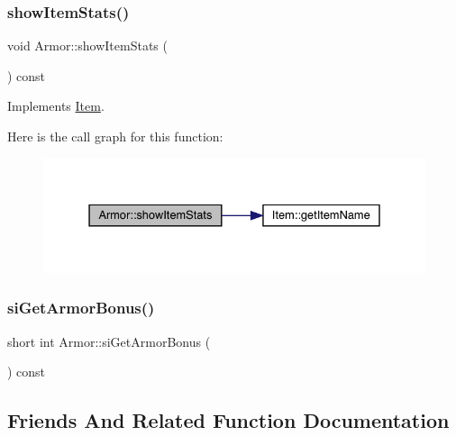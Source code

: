 \subsubsection{\texorpdfstring{show\+Item\+Stats()}{showItemStats()}}
{\footnotesize\ttfamily void Armor\+::show\+Item\+Stats (\begin{DoxyParamCaption}{ }\end{DoxyParamCaption}) const\hspace{0.3cm}{\ttfamily [virtual]}}



Implements \mbox{\hyperlink{class_item_aaf7dae41afdce432c11261043e8e4e30}{Item}}.

Here is the call graph for this function\+:
\nopagebreak
\begin{figure}[H]
\begin{center}
\leavevmode
\includegraphics[width=331pt]{d9/d76/class_armor_a4fe1507d7aaf280a18e19f51a6f8c42d_cgraph}
\end{center}
\end{figure}
\mbox{\label{class_armor_a72b3d5c0294e80243ed8c96dbc35ccc7}} 
\subsubsection{\texorpdfstring{si\+Get\+Armor\+Bonus()}{siGetArmorBonus()}}
{\footnotesize\ttfamily short int Armor\+::si\+Get\+Armor\+Bonus (\begin{DoxyParamCaption}{ }\end{DoxyParamCaption}) const}



\subsection{Friends And Related Function Documentation}
\mbox{\label{class_armor_aad85754f188b769ff61150eaf36106c4}} 
